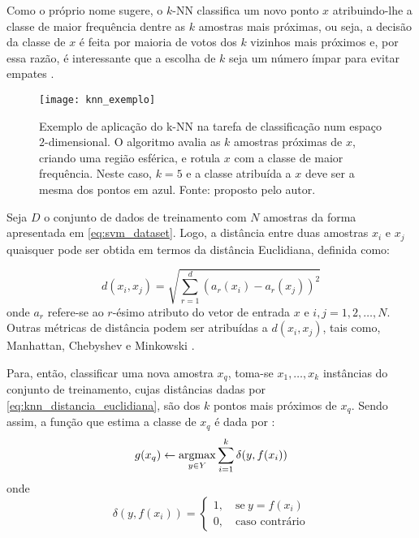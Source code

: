 Como o próprio nome sugere, o $k$-NN classifica um novo ponto $x$ atribuindo-lhe a classe de maior frequência dentre as $k$ amostras mais próximas, ou seja, a decisão da classe de $x$ é feita por maioria de votos dos $k$ vizinhos mais próximos e, por essa razão, é interessante que a escolha de $k$ seja um número ímpar para evitar empates \citep{duda:12}.

\begin{figure}[!h]
  \centering
  \texttt{[image: knn\_exemplo]}
  \caption[Exemplo de aplicação do $k$-NN na tarefa de classificação num espaço $2$-dimensional]{Exemplo de aplicação do k-NN na tarefa de classificação num espaço $2$-dimensional. O algoritmo avalia as $k$ amostras próximas de $x$, criando uma região esférica, e rotula $x$ com a classe de maior frequência. Neste caso, $k = 5$ e a classe atribuída a $x$ deve ser a mesma dos pontos em azul. Fonte: proposto pelo autor.}
  \label{fig:knn_exemplo}
\end{figure}

Seja $D$ o conjunto de dados de treinamento com $N$ amostras da forma apresentada em \ref{eq:svm_dataset}. Logo, a distância entre duas amostras $x_i$ e $x_j$ quaisquer pode ser obtida em termos da distância Euclidiana, definida como:

\begin{equation}
\label{eq:knn_distancia_euclidiana}
d(x_i, x_j) = \sqrt{\sum_{r=1}^d (a_r(x_i) - a_r(x_j))^2}
\end{equation}
\noindent onde $a_r$ refere-se ao $r$-ésimo atributo do vetor de entrada $x$ e $i, j = 1, 2, \ldots, N$. Outras métricas de distância podem ser atribuídas a $d(x_i, x_j)$, tais como, Manhattan, Chebyshev e Minkowski \citep{duda:12}.

Para, então, classificar uma nova amostra $x_q$, toma-se $x_1, \ldots, x_k$ instâncias do conjunto de treinamento, cujas distâncias dadas por \ref{eq:knn_distancia_euclidiana}, são dos $k$ pontos mais próximos de $x_q$. Sendo assim, a função que estima a classe de $x_q$ é dada por \citep{mitchell:97}:
\begin{equation}
\label{eq:knn_funcao_argmax}
g(x_q) \gets \operatorname*{argmax}_{y \in Y} \sum_{i=1}^k \delta (y, f(x_i))
\end{equation}
\noindent onde
\begin{equation}
\label{eq:knn_delta}
  \delta (y, f(x_i)) =  \begin{cases}
                1, \quad \text{se}\ y = f(x_i) \\
                0, \quad \text{caso contrário}
              \end{cases}
\end{equation}

